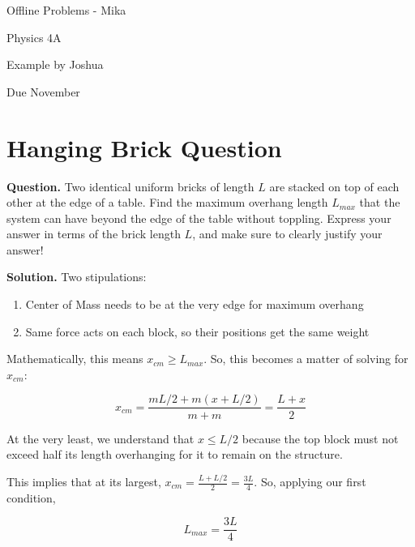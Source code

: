 \documentclass{article}
\begin{document}
    \thispagestyle{firstpage}
    \newpage
    \vspace*{\fill}
    \begin{center}
        \begin{minipage}{.6\textwidth}
            \begin{centering}
		{\huge Offline Problems - Mika\bigskip

                Physics 4A\bigskip

                Example by Joshua\bigskip

                Due November}

            \end{centering}
        \end{minipage}
    \end{center}
    \vfill

    \newpage
	\section{Hanging Brick Question}
	\textbf{Question.} Two identical uniform bricks of length $L$ are stacked on top of each other at the edge of a table. Find the maximum overhang length $L_{max}$ that the system can have beyond the edge of the table without toppling. Express your answer in terms of the brick length $L$, and make sure to clearly justify your answer! \bigskip

	\noindent\textbf{Solution.} Two stipulations:
	\begin{enumerate}
		\item Center of Mass needs to be at the very edge for maximum overhang
		\item Same force acts on each block, so their positions get the same weight
	\end{enumerate}

	Mathematically, this means $x_{cm} \geq L_{max}$. So, this becomes a matter of solving for $x_{cm}$:


	\[ x_{cm} = \frac{mL/2 + m(x + L/2)}{m + m} = \frac{L + x}{2} \]

	At the very least, we understand that $x \leq L/2$ because the top block must not exceed half its length overhanging for it to remain on the structure. \bigskip

	This implies that at its largest, $x_{cm} = \frac{L + L/2}{2} = \frac{3L}{4}$. So, applying our first condition,

	\[ \boxed{L_{max} = \frac{3L}{4}} \]
\end{document}
